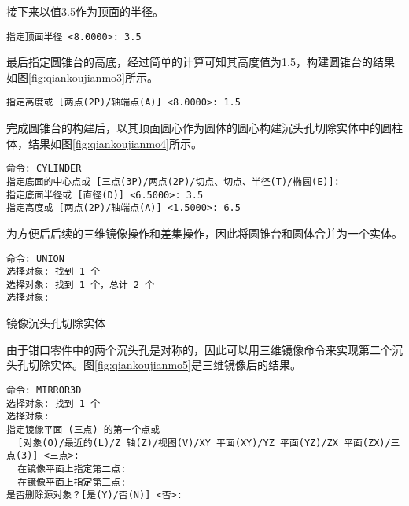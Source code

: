 \begin{procedure}
接下来以值3.5作为顶面的半径。

\begin{lstlisting}
指定顶面半径 <8.0000>: 3.5
\end{lstlisting}

最后指定圆锥台的高底，经过简单的计算可知其高度值为1.5，构建圆锥台的结果如图\ref{fig:qiankoujianmo3}所示。

\begin{lstlisting}
指定高度或 [两点(2P)/轴端点(A)] <8.0000>: 1.5
\end{lstlisting}

\begin{figure}[htbp]
\centering
\begin{floatrow}[2]
\end{floatrow}
\end{figure}

完成圆锥台的构建后，以其顶面圆心作为圆体的圆心构建沉头孔切除实体中的圆柱体，结果如图\ref{fig:qiankoujianmo4}所示。

\begin{lstlisting}
命令: CYLINDER
指定底面的中心点或 [三点(3P)/两点(2P)/切点、切点、半径(T)/椭圆(E)]:
指定底面半径或 [直径(D)] <6.5000>: 3.5
指定高度或 [两点(2P)/轴端点(A)] <1.5000>: 6.5
\end{lstlisting}

为方便后后续的三维镜像操作和差集操作，因此将圆锥台和圆体合并为一个实体。

\begin{lstlisting}
命令: UNION
选择对象: 找到 1 个
选择对象: 找到 1 个，总计 2 个
选择对象:
\end{lstlisting}

\item 镜像沉头孔切除实体

由于钳口零件中的两个沉头孔是对称的，因此可以用三维镜像命令来实现第二个沉头孔切除实体。图\ref{fig:qiankoujianmo5}是三维镜像后的结果。

\begin{lstlisting}
命令: MIRROR3D
选择对象: 找到 1 个
选择对象:
指定镜像平面 (三点) 的第一个点或
  [对象(O)/最近的(L)/Z 轴(Z)/视图(V)/XY 平面(XY)/YZ 平面(YZ)/ZX 平面(ZX)/三点(3)] <三点>: 
  在镜像平面上指定第二点: 
  在镜像平面上指定第三点:
是否删除源对象？[是(Y)/否(N)] <否>:
\end{lstlisting}


\end{procedure}
